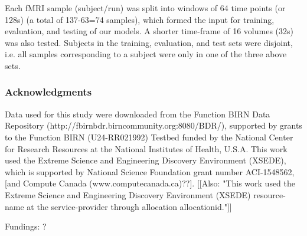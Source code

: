 \documentclass{article} %
\begin{document}
Each fMRI sample (subject/run) was split into windows of 64 time points (or 128s) (a total of 137-63=74 samples), which formed the input for training, evaluation, and testing of our models. A shorter time-frame of 16 volumes (32s) was also tested. Subjects in the training, evaluation, and test sets were disjoint, i.e. all samples corresponding to a subject were only in one of the three above sets.  


\subsubsection*{Acknowledgments}

Data used for this study were downloaded from the Function BIRN Data Repository (http://fbirnbdr.birncommunity.org:8080/BDR/), supported by grants to the Function BIRN (U24-RR021992) Testbed funded by the National Center for Research Resources at the National Institutes of Health, U.S.A.	
This work used the Extreme Science and Engineering Discovery Environment (XSEDE), which is supported by National Science Foundation grant number ACI-1548562, [and Compute Canada (www.computecanada.ca)??]. 
[[Also: "This work used the Extreme Science and Engineering Discovery Environment (XSEDE) resource-name at the service-provider through allocation allocationid."]]

Fundings: ? 




\end{document}
